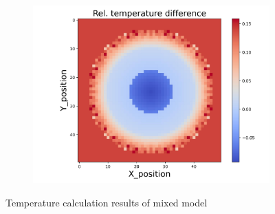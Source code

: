 \begin{figure}[h]
\begin{minipage}{\textwidth}
\begin{subfigure}{0.325\textwidth}
            \centering
            \includegraphics[width=\textwidth]{figures/raw_data/33/mix/T_bias.jpg}
        \end{subfigure}
    \end{minipage}
    \caption{Temperature calculation results of mixed model}  
\end{figure}
